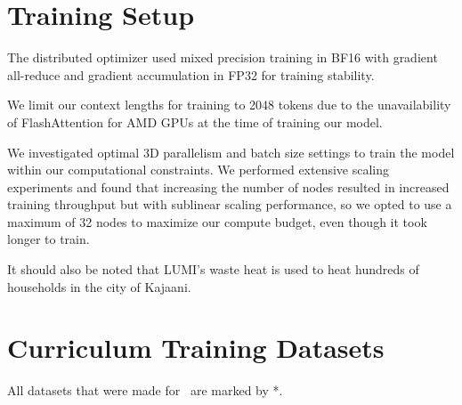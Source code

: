 


\section{Training Setup} \label{training_setup_apdx}
The distributed optimizer used mixed precision training in BF16 with gradient all-reduce and gradient accumulation in FP32 for training stability. 

We limit our context lengths for training to 2048 tokens due to the unavailability of FlashAttention \citep{dao2022flashattention} for AMD GPUs at the time of training our model.

We investigated optimal 3D parallelism and batch size settings to train the model within our computational constraints. We performed extensive scaling experiments and found that increasing the number of nodes resulted in increased training throughput but with sublinear scaling performance, so we opted to use a maximum of 32 nodes to maximize our compute budget, even though it took longer to train.

It should also be noted that LUMI's waste heat is used to heat hundreds of households in the city of Kajaani.

\section{Curriculum Training Datasets} 
All datasets that were made for \system~are marked by *.
\label{datasets}
